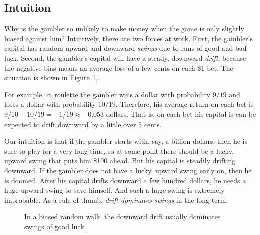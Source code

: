 \subsection{Intuition}

Why is the gambler so unlikely to make money when the game is only
slightly biased against him?  Intuitively, there are two forces at
work.  First, the gambler's capital has random upward and downward
{\em swings} due to runs of good and bad luck.  Second, the gambler's
capital will have a steady, downward {\em drift}, because the negative
bias means an average loss of a few cents on each \$1 bet.  The
situation is shown in Figure~\ref{fig:19P3}.

\begin{editingnotes}

For example, in roulette the gambler wins a dollar with probability $9/19$
and loses a dollar with probability $10/19$.  Therefore, his average
return on each bet is $9/10 - 10/19 = - 1/19 \approx -0.053$ dollars.
That is, on each bet his capital is can be expected to drift downward by a
little over 5 cents.

\end{editingnotes}

Our intuition is that if the gambler starts with, say, a billion
dollars, then he is sure to play for a very long time, so at some
point there should be a lucky, upward swing that puts him \$100 ahead.
But his capital is steadily drifting downward.  If the gambler does
not have a lucky, upward swing early on, then he is doomed.  After his
capital drifts downward a few hundred dollars, he needs a huge upward
swing to save himself.  And such a huge swing is extremely improbable.
As a rule of thumb, \emph{drift dominates swings} in the long term.

\begin{figure}[h]


\caption{In a biased random walk, the downward drift usually dominates
  swings of good luck.}

\label{fig:19P3}

\end{figure}

\iffalse
\begin{figure}
\centerline{\texttt{[image: walk2]}}
\caption{\em In an unfair game, the gambler's capital swings randomly up
and down, but steadily drifts downward.  If the gambler does not have
a winning swing early on, then his capital drifts downward, and later
upward swings are insufficient to make him a winner.}
\label{LN12:fig:walk2}
\end{figure}
\fi

